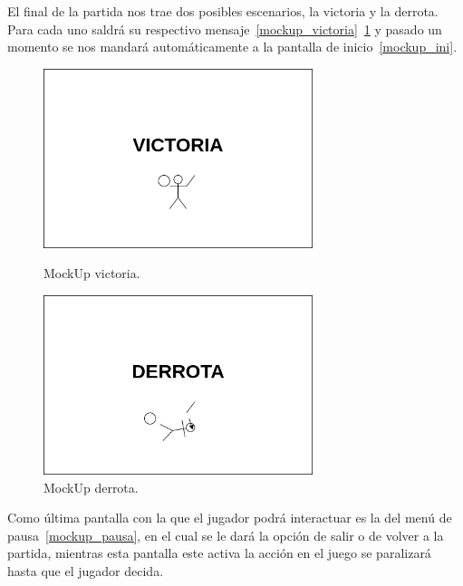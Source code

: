 El final de la partida nos trae dos posibles escenarios, la victoria y la derrota. 
Para cada uno saldrá su respectivo mensaje~\ref{mockup_victoria}~\ref{mockup_derrota}
y pasado un momento se nos mandará automáticamente a la pantalla de
inicio~\ref{mockup_ini}.

\begin{figure}[hb]
\centering
\begin{minipage}[c]{0.45\linewidth}
	\hspace{9mm}
	\includegraphics[width=0.7\textwidth]{imagenes/gdd/pantallas/Pantalla_victoria.png}
	\caption{MockUp victoria.}
	\label{mockup_victoria}
\end{minipage}
\begin{minipage}[c]{0.45\linewidth}
	\hspace{9mm}
	\includegraphics[width=0.7\textwidth]{imagenes/gdd/pantallas/Pantalla_derrota.png}
	\caption{MockUp derrota.}
	\label{mockup_derrota}
\end{minipage}	
\end{figure}

Como última pantalla con la que el jugador podrá interactuar es la del menú de
pausa~\ref{mockup_pausa}, en el cual se le dará la opción de salir o de volver a la
partida, mientras esta pantalla este activa la acción en el juego se paralizará hasta
que el jugador decida. 

